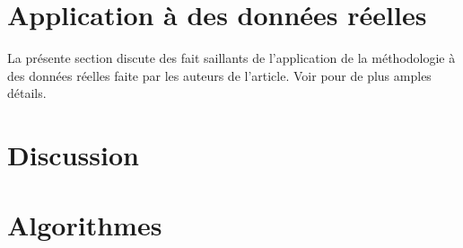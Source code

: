 \section{Application à des données réelles}
La présente section discute des fait saillants de l'application de la méthodologie à des données réelles faite par les auteurs de l'article. Voir \cite{chavez2016extreme} pour de plus amples détails.



\section{Discussion}

\section{Algorithmes}
\label{sec:algos}
